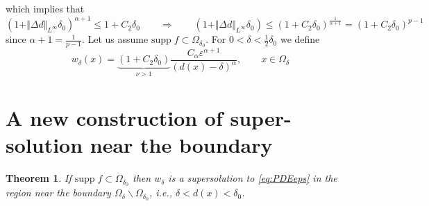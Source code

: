 \documentclass[10pt]{article}
\theoremstyle{plain}
\newtheorem{thm}{Theorem}
\theoremstyle{remark}
\begin{document}
which implies that
\begin{equation}\label{e:cru1}
    (1+\Vert \Delta d\Vert_{L^\infty}\delta_0)^{\alpha+1} \leq 1 + C_2\delta_0 \qquad\Longrightarrow\qquad (1+\Vert \Delta d\Vert_{L^\infty}\delta_0) \leq (1+C_2\delta_0)^{\frac{1}{\alpha+1}} = (1+C_2\delta_0)^{p-1}
\end{equation}
since $\alpha+1 = \frac{1}{p-1}$. Let us assume $\mathrm{supp}\;f\subset \Omega_{\delta_0}$. For $0<\delta<\frac{1}{2}\delta_0$ we define %
\begin{equation*}
    w_\delta(x) = \underbrace{(1+C_2\delta_0)}_{\nu > 1}\frac{C_\alpha\varepsilon^{\alpha+1}}{(d(x)-\delta)^\alpha}, \qquad x\in \Omega_\delta
\end{equation*}
\section{A new construction of super-solution near the boundary}
\begin{thm}\label{thm:super_strip} If $\mathrm{supp}\;f\subset \Omega_{\delta_0}$ then $w_\delta$ is a supersolution to \eqref{eq:PDEeps} in the region near the boundary $\Omega_\delta\backslash \Omega_{\delta_0}$, i.e., $\delta < d(x)< \delta_0$.
\end{thm}
\end{document}
